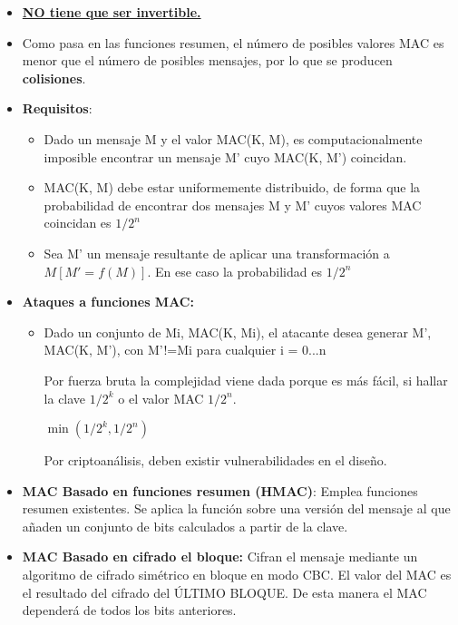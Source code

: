 \documentclass[12pt, twoside, openright]{report} %
\begin{document}
\begin{itemize}
\begin{itemize}
\begin{itemize}
			            \item \textbf{\underline{NO tiene que ser invertible.}}
			            \item Como pasa en las funciones resumen, el número de posibles valores MAC es menor que el número de posibles mensajes, por lo que se producen \textbf{colisiones}.
			            \item \textbf{Requisitos}:
			                  \begin{itemize}
				                  \item Dado un mensaje M y el valor MAC(K, M), es computacionalmente imposible encontrar un mensaje M' cuyo MAC(K, M') coincidan.
				                  \item MAC(K, M) debe estar uniformemente distribuido, de forma que la probabilidad de encontrar dos mensajes M y M' cuyos valores MAC coincidan es $1/2^n$
				                  \item Sea M' un mensaje resultante de aplicar una transformación a
				                        $ M[M'= f(M)]$. En ese caso la probabilidad es $1/2^n$
			                  \end{itemize}
			            \item \textbf{Ataques a funciones MAC:}
			                  \begin{itemize}
				                  \item Dado un conjunto de Mi, MAC(K, Mi), el atacante desea generar M', MAC(K, M'), con M'!=Mi para cualquier i = 0...n

				                        Por fuerza bruta la complejidad viene dada porque es más fácil, si hallar la clave $1/2^k$ o el valor MAC $1/2^n$.

				                        \textbf{\underline{$\min(1/2^k, 1/2^n)$}}

				                        Por criptoanálisis, deben existir vulnerabilidades en el diseño.

			                  \end{itemize}
			            \item \textbf{MAC Basado en funciones resumen (HMAC)}: Emplea funciones resumen existentes. Se aplica la función sobre una versión del mensaje al que añaden un conjunto de bits calculados a partir de la clave.
			            \item \textbf{MAC Basado en cifrado el bloque:} Cifran el mensaje mediante un algoritmo de cifrado simétrico en bloque en modo CBC. El valor del MAC es el resultado del cifrado del ÚLTIMO BLOQUE. De esta manera el MAC dependerá de todos los bits anteriores.
		            \end{itemize}
	      \end{itemize}
\end{itemize}
\end{document}
